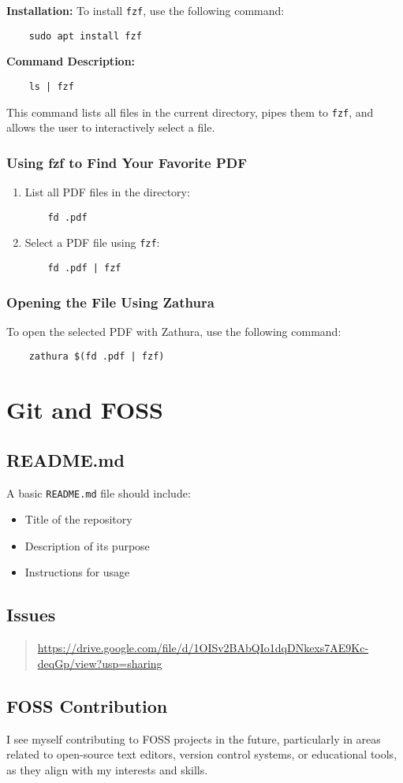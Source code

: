 \documentclass[12pt,a4paper]{article}
\begin{document}
\textbf{Installation:} To install \texttt{fzf}, use the following command:
\begin{verbatim}
    sudo apt install fzf
\end{verbatim}
\textbf{Command Description:}
\begin{verbatim}
    ls | fzf
\end{verbatim}
This command lists all files in the current directory, pipes them to \texttt{fzf}, and allows the user to interactively select a file.

\subsubsection{Using fzf to Find Your Favorite PDF}
\begin{enumerate}
    \item List all PDF files in the directory:
    \begin{verbatim}
    fd .pdf
    \end{verbatim}
    \item Select a PDF file using \texttt{fzf}:
    \begin{verbatim}
    fd .pdf | fzf
    \end{verbatim}
\end{enumerate}

\subsubsection{Opening the File Using Zathura}
To open the selected PDF with Zathura, use the following command:
\begin{verbatim}
    zathura $(fd .pdf | fzf)
\end{verbatim}

\section{Git and FOSS}
\subsection{README.md}
A basic \texttt{README.md} file should include:
\begin{itemize}
    \item Title of the repository
    \item Description of its purpose
    \item Instructions for usage
\end{itemize}

\subsection{Issues}
\begin{quote}
    \url{https://drive.google.com/file/d/1OISv2BAbQIo1dqDNkexs7AE9Kc-deqGp/view?usp=sharing}
\end{quote}

\subsection{FOSS Contribution}
I see myself contributing to FOSS projects in the future, particularly in areas related to open-source text editors, version control systems, or educational tools, as they align with my interests and skills.
\end{document}
